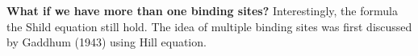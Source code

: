 {\bf What if we have more than one binding
sites?} Interestingly, the formula the Shild equation still hold. The idea of
multiple binding sites was first discussed by Gaddhum (1943) using Hill
equation.

%



%
%
